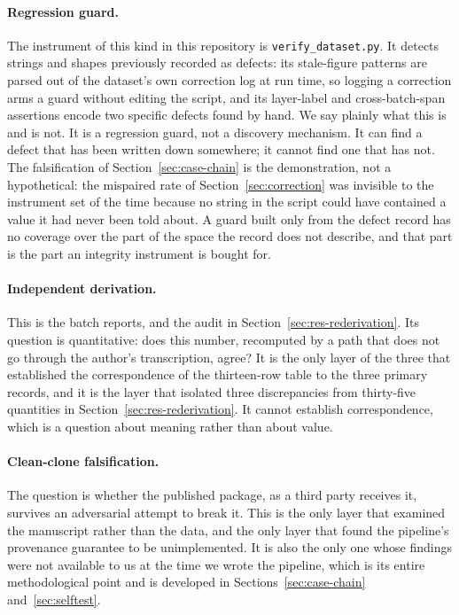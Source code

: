 \documentclass[sigconf,review]{acmart}
\begin{document}
\paragraph{Regression guard.} The instrument of this kind in this repository is
\texttt{verify\_dataset.py}. It detects strings and shapes previously recorded
as defects: its stale-figure patterns are parsed out of the dataset's own
correction log at run time, so logging a correction arms a guard without
editing the script, and its layer-label and cross-batch-span assertions encode
two specific defects found by hand. We say plainly what this is and is not. It
is a regression guard, not a discovery mechanism. It can find a defect that has
been written down somewhere; it cannot find one that has not. The falsification
of Section~\ref{sec:case-chain} is the demonstration, not a hypothetical: the
mispaired rate of Section~\ref{sec:correction} was invisible to the instrument
set of the time because no string in the script could have contained a value it
had never been told about. A guard built only from the defect record has no
coverage over the part of the space the record does not describe, and that part
is the part an integrity instrument is bought for.

\paragraph{Independent derivation.} This is the batch reports, and the audit
in Section~\ref{sec:res-rederivation}. Its question is quantitative: does this
number, recomputed by a path that does not go through the author's
transcription, agree? It is the only layer of the three that established the
correspondence of the thirteen-row table to the three primary records, and it
is the layer that isolated three discrepancies from thirty-five quantities in
Section~\ref{sec:res-rederivation}. It cannot establish correspondence, which
is a question about meaning rather than about value.

\paragraph{Clean-clone falsification.} The question is whether the published
package, as a third party receives it, survives an adversarial attempt to break
it. This is the only layer that examined the manuscript rather than the data,
and the only layer that found the pipeline's provenance guarantee to be
unimplemented. It is also the only one whose findings were not available to us
at the time we wrote the pipeline, which is its entire methodological point and
is developed in Sections~\ref{sec:case-chain} and~\ref{sec:selftest}.
\end{document}
